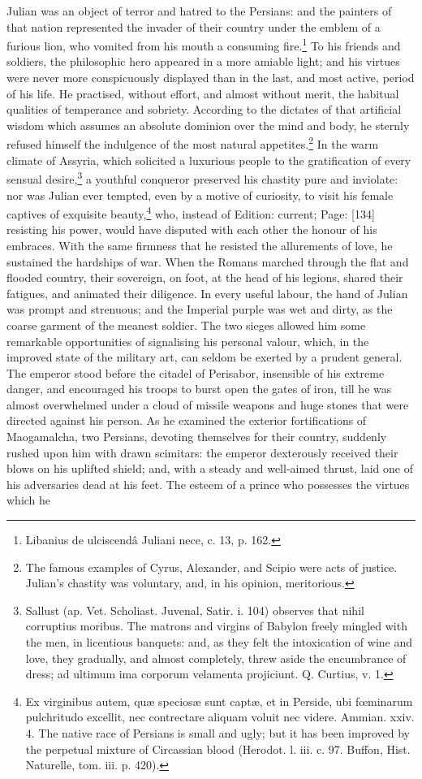 Julian was an object of terror and hatred to the Persians: and the painters of that nation represented the invader of their country under the emblem of a furious lion, who vomited from his mouth a consuming fire.\footnote{Libanius de ulciscendâ Juliani nece, c. 13, p. 162.} To his friends and soldiers, the philosophic hero appeared in a more amiable light; and his virtues were never more conspicuously displayed than in the last, and most active, period of his life. He practised, without effort, and almost without merit, the habitual qualities of temperance and sobriety. According to the dictates of that artificial wisdom which assumes an absolute dominion over the mind and body, he sternly refused himself the indulgence of the most natural appetites.\footnote{The famous examples of Cyrus, Alexander, and Scipio were acts of justice. Julian\texthebrew{}’s chastity was voluntary, and, in his opinion, meritorious.} In the warm climate of Assyria, which solicited a luxurious people to the gratification of every sensual desire,\footnote{Sallust (ap. Vet. Scholiast. Juvenal, Satir. i. 104) observes that nihil corruptius moribus. The matrons and virgins of Babylon freely mingled with the men, in licentious banquets: and, as they felt the intoxication of wine and love, they gradually, and almost completely, threw aside the encumbrance of dress; ad ultimum ima corporum velamenta projiciunt. Q. Curtius, v. 1.} a youthful conqueror preserved his chastity pure and inviolate: nor was Julian ever tempted, even by a motive of curiosity, to visit his female captives of exquisite beauty,\footnote{Ex virginibus autem, quæ speciosæ sunt captæ, et in Perside, ubi fœminarum pulchritudo excellit, nec contrectare aliquam voluit nec videre. Ammian. xxiv. 4. The native race of Persians is small and ugly; but it has been improved by the perpetual mixture of Circassian blood (Herodot. l. iii. c. 97. Buffon, Hist. Naturelle, tom. iii. p. 420).} who, instead of Edition: current; Page: [134] resisting his power, would have disputed with each other the honour of his embraces. With the same firmness that he resisted the allurements of love, he sustained the hardships of war. When the Romans marched through the flat and flooded country, their sovereign, on foot, at the head of his legions, shared their fatigues, and animated their diligence. In every useful labour, the hand of Julian was prompt and strenuous; and the Imperial purple was wet and dirty, as the coarse garment of the meanest soldier. The two sieges allowed him some remarkable opportunities of signalising his personal valour, which, in the improved state of the military art, can seldom be exerted by a prudent general. The emperor stood before the citadel of Perisabor, insensible of his extreme danger, and encouraged his troops to burst open the gates of iron, till he was almost overwhelmed under a cloud of missile weapons and huge stones that were directed against his person. As he examined the exterior fortifications of Maogamalcha, two Persians, devoting themselves for their country, suddenly rushed upon him with drawn scimitars: the emperor dexterously received their blows on his uplifted shield; and, with a steady and well-aimed thrust, laid one of his adversaries dead at his feet. The esteem of a prince who possesses the virtues which he 